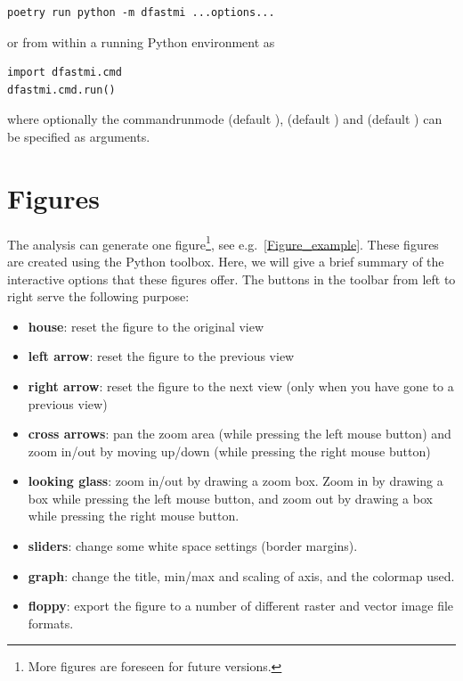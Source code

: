 \begin{Verbatim}
poetry run python -m dfastmi ...options...
\end{Verbatim}

or from within a running Python environment as

\begin{Verbatim}
import dfastmi.cmd
dfastmi.cmd.run()
\end{Verbatim}

where optionally the command{runmode} (default ),  (default ) and  (default ) can be specified as arguments.

\section{Figures}\label{Sec:FigNavigation}

The analysis can generate one figure\footnote{More figures are foreseen for future versions.}, see e.g.~\autoref{Figure_example}.
These figures are created using the Python  toolbox.
Here, we will give a brief summary of the interactive options that these figures offer.
The buttons in the toolbar from left to right serve the following purpose:

\begin{itemize}
\item \textbf{house}: reset the figure to the original view
\item \textbf{left arrow}: reset the figure to the previous view
\item \textbf{right arrow}: reset the figure to the next view (only when you have gone to a previous view)
\item \textbf{cross arrows}: pan the zoom area (while pressing the left mouse button) and zoom in/out by moving up/down (while pressing the right mouse button)
\item \textbf{looking glass}: zoom in/out by drawing a zoom box. Zoom in by drawing a box while pressing the left mouse button, and zoom out by drawing a box while pressing the right mouse button.
\item \textbf{sliders}: change some white space settings (border margins).
\item \textbf{graph}: change the title, min/max and scaling of axis, and the colormap used.
\item \textbf{floppy}: export the figure to a number of different raster and vector image file formats.
\end{itemize}

